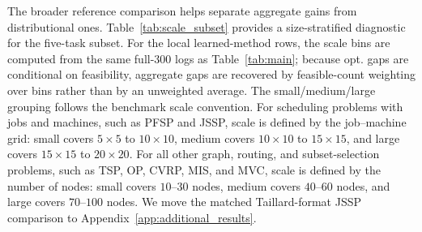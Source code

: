 \documentclass{article}
\theoremstyle{remark}
\begin{document}
\begin{table}[!t]
\centering
\caption{Comparison with problem-specific solvers (LKH for TSP, EA4OP for OP, HGS for CVRP, and Gurobi for MIS and JSSP), Gurobi, and CLASP. Results are reported as optimality gap(time), and ``-'' denotes an infeasible solution. The CLASP row uses the same best-of-8 setting as Table~\ref{tab:main}; its time includes decoding, parsing, rescoring, and feasible-candidate selection.}
\label{tab:sota_solver_comparison}
\tiny
{}
\end{table}





\FloatBarrier

The broader reference comparison helps separate aggregate gains from distributional ones. Table~\ref{tab:scale_subset} provides a size-stratified diagnostic for the five-task subset. For the local learned-method rows, the scale bins are computed from the same full-300 logs as Table~\ref{tab:main}; because opt. gaps are conditional on feasibility, aggregate gaps are recovered by feasible-count weighting over bins rather than by an unweighted average. The small/medium/large grouping follows the benchmark scale convention. For scheduling problems with jobs and machines, such as PFSP and JSSP, scale is defined by the job--machine grid: small covers \(5\times5\) to \(10\times10\), medium covers \(10\times10\) to \(15\times15\), and large covers \(15\times15\) to \(20\times20\). For all other graph, routing, and subset-selection problems, such as TSP, OP, CVRP, MIS, and MVC, scale is defined by the number of nodes: small covers \(10\)--\(30\) nodes, medium covers \(40\)--\(60\) nodes, and large covers \(70\)--\(100\) nodes. We move the matched Taillard-format JSSP comparison to Appendix~\ref{app:additional_results}.
\end{document}
